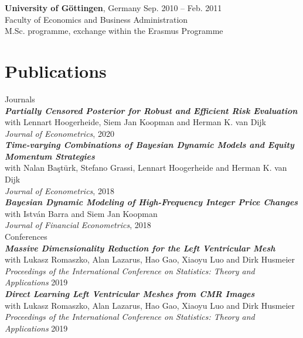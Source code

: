 \documentclass[margin,line]{resume}
\begin{document}
\begin{resume}
	\textbf{University of G{\"o}ttingen}, Germany   \hfill Sep. 2010 -- Feb. 2011	\\
    Faculty of Economics and Business Administration \\M.Sc. programme, exchange within the Erasmus Programme
        

\vspace{-2mm}    
\section{\mysidestyle Publications}
{\mysidestyle Journals\vspace{1mm}}\\
\textit{\textbf{Partially Censored Posterior for Robust and Efficient Risk Evaluation}}\\
	with Lennart Hoogerheide, Siem Jan Koopman and Herman K. van Dijk\\
	\textit{Journal of Econometrics}, 2020\vspace{2mm}\\ 
\textit{\textbf{Time-varying Combinations of Bayesian Dynamic Models and Equity Momentum Strategies}}\\
	with Nalan Ba\c{s}t\"{u}rk, Stefano Grassi, Lennart Hoogerheide and Herman K. van Dijk\\
	\textit{Journal of Econometrics}, 2018 \vspace{2mm} \\
\textit{\textbf{Bayesian Dynamic Modeling of High-Frequency Integer Price Changes}}\\
	with Istv\'{a}n Barra  and Siem Jan Koopman\\
	\textit{Journal of Financial Econometrics}, 2018\\ 

	\vspace{-5mm}
{\mysidestyle Conferences}  \vspace{1mm}\\	
\textit{\textbf{Massive Dimensionality Reduction for the Left Ventricular Mesh}}\\
	with Lukasz Romaszko, Alan Lazarus, Hao Gao, Xiaoyu Luo and Dirk Husmeier\\
	\textit{Proceedings of the International Conference on Statistics: Theory and Applications} 2019  \vspace{2mm}\\
\textit{\textbf{Direct Learning Left Ventricular Meshes from CMR Images}}\\
	with Lukasz Romaszko, Alan Lazarus, Hao Gao, Xiaoyu Luo and Dirk Husmeier\\
	\textit{Proceedings of the International Conference on Statistics: Theory and Applications} 2019 \vspace{1mm} \\


\end{resume}
\end{document}
